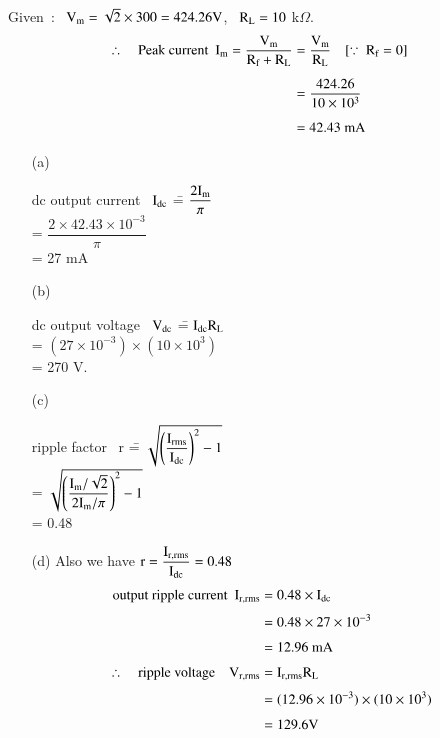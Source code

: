 \begin{solution}
Given~:~ $\textrm{V}_{\textrm{m}}=\sqrt{2}\times 300=424.26\textrm{V}$, \ $\textrm{R}_{\textrm{L}}=10$ k$\Omega$.
\begin{align*}
\therefore\quad \text{Peak current~ } \textrm{I}_{\textrm{m}} = \frac{\textrm{V}_{\textrm{m}}}{\textrm{R}_{\textrm{f}}+\textrm{R}_{\textrm{L}}} &= \frac{\textrm{V}_{\textrm{m}}}{\textrm{R}_{\textrm{L}}}\quad [\because \ \textrm{R}_{\textrm{f}}=0]\\[5pt]
&= \dfrac{424.26}{10\times 10^{3}}\\[5pt]
&= 42.43\text{~mA}
\end{align*}
\begin{itemize}
\item[(a)] 
\begin{tabbing}
dc output current \ $\textrm{I}_{\text{dc}}$ \== $\dfrac{2\textrm{I}_{\textrm{m}}}{\pi}$\\[5pt]
                                    \>= $\dfrac{2\times 42.43\times 10^{-3}}{\pi}$\\[5pt]
                                    \>= 27 mA
\end{tabbing}

\item[(b)]
\begin{tabbing}
dc output voltage \ $\textrm{V}_{\text{dc}}$ \== $\textrm{I}_{\text{dc}}\textrm{R}_{\textrm{L}}$\\[5pt]
                                    \>= $(27\times 10^{-3})\times (10\times 10^{3})$\\[5pt]
                                    \>= 270 V.
\end{tabbing}

\eject

\item[(c)] 
\begin{tabbing}
ripple factor \ r \== $\sqrt{\left(\dfrac{\textrm{I}_{\text{rms}}}{\textrm{I}_{\text{dc}}}\right)^{2}-1}$\\[5pt]
                             \>= $\sqrt{\left(\dfrac{\textrm{I}_{\textrm{m}}/\sqrt{2}}{2\textrm{I}_{\textrm{m}}/\pi}\right)^{2}-1}$\\[5pt]
                             \>= 0.48
\end{tabbing}

\item[(d)] Also we have $\textrm{r} = \dfrac{\textrm{I}_{\textrm{r},\text{rms}}}{\textrm{I}_{\text{dc}}}=0.48$
\begin{align*}
\text{output ripple current~ } \textrm{I}_{\textrm{r}, \text{rms}} &= 0.48\times \textrm{I}_{\text{dc}}\\[3pt]
 &= 0.48\times 27\times 10^{-3}\\[3pt]
&= 12.96\text{~mA}\\[3pt]
\therefore\quad \text{ripple voltage~~~ } \textrm{V}_{\textrm{r},\text{rms}} &= \textrm{I}_{\textrm{r},\text{rms}}\textrm{R}_{\textrm{L}}\\[3pt]
&= (12.96\times 10^{-3})\times (10\times 10^{3})\\[3pt]
&= 129.6\textrm{V}
\end{align*}
\end{itemize}
\end{solution}

